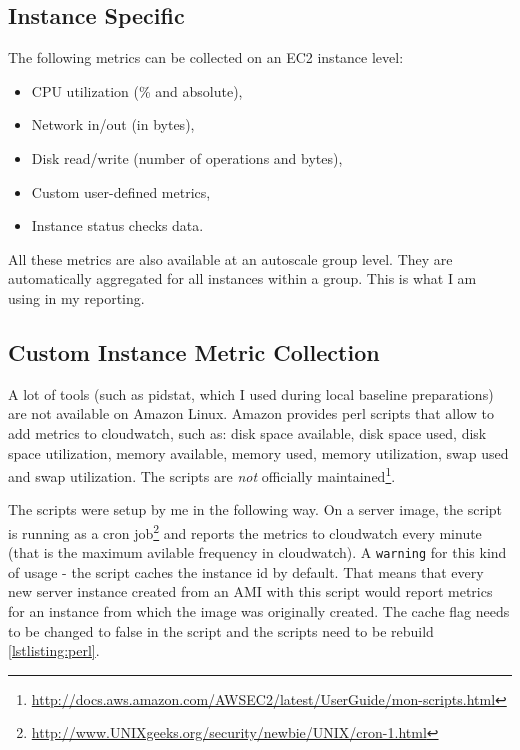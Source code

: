 \documentclass{uvamscse}
\begin{document}
\subsection{Instance Specific}
The following metrics can be collected on an EC2 instance level:
\begin{itemize}
  \item CPU utilization (\% and absolute),
  \item Network in/out (in bytes),
  \item Disk read/write (number of operations and bytes),
  \item Custom user-defined metrics,
  \item Instance status checks data.
\end{itemize}

All these metrics are also available at an autoscale group level. They are automatically aggregated for all instances within a group. This is what I am using in my reporting.

\subsection{Custom Instance Metric Collection} \label{Custom Metric Collection}
A lot of tools (such as pidstat, which I used during local baseline preparations) are not available on Amazon Linux. Amazon provides perl scripts that allow to add metrics to cloudwatch, such as: disk space available, disk space used, disk space utilization, memory available, memory used, memory utilization, swap used and swap utilization. The scripts are \textit{not} officially maintained\footnote{\url{http://docs.aws.amazon.com/AWSEC2/latest/UserGuide/mon-scripts.html}}.

The scripts were setup by me in the following way. On a server image, the script is running as a cron job\footnote{\url{http://www.UNIXgeeks.org/security/newbie/UNIX/cron-1.html}} and reports the metrics to cloudwatch every minute (that is the maximum avilable frequency in cloudwatch). A \texttt{warning} for this kind of usage - the script caches the instance id by default. That means that every new server instance created from an AMI with this script would report metrics for an instance from which the image was originally created. The cache flag needs to be changed to false in the script and the scripts need to be rebuild \ref{lstlisting:perl}.
\end{document}

